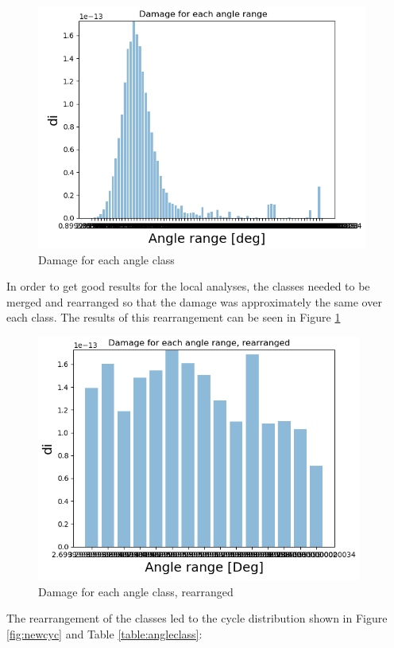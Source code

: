 \begin{figure}[H]
\centering
\includegraphics[scale=0.9]{figures/initialdam}
\caption[Damage for each angle class]{Damage for each angle class}
 \label{fig:initialdam}
\end{figure}
\noindent In order to get good results for the local analyses, the classes needed to be merged and rearranged so that the damage was approximately the same over each class. The results of this rearrangement can be seen in Figure \ref{fig:initialdam}

\begin{figure}[H]
\centering
\includegraphics[scale=0.9]{figures/newdam}
\caption[Damage for each angle class, rearranged]{Damage for each angle class, rearranged}
 \label{fig:newdam}
\end{figure}

The rearrangement of the classes led to the cycle distribution shown in Figure \ref{fig:newcyc} and Table \ref{table:angleclass}:

